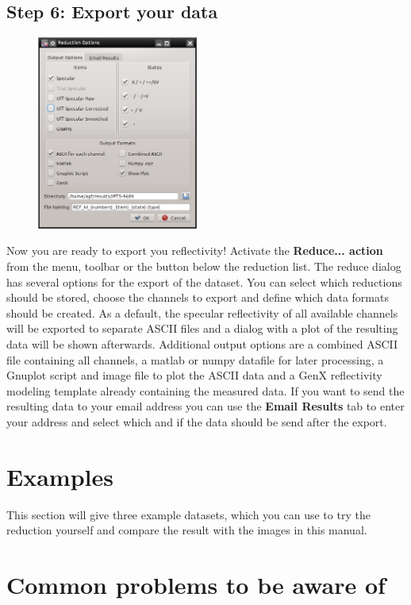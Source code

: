 \subsection{Step 6: Export your data}
  \label{sec:export}
    \begin{figure}
    \centering
     \includegraphics[width=150pt]{screenshots/reduced.png}
    \end{figure}
    Now you are ready to export you reflectivity! 
    Activate the \textbf{Reduce... action}  from the menu, toolbar or the button below the reduction list.
    The reduce dialog has several options for the export of the dataset.
    You can select which reductions should be stored, choose the channels to export and define which data formats should be created.
    As a default, the specular reflectivity of all available channels will be exported to separate ASCII files and a dialog with a plot of the resulting data will be shown afterwards.
    Additional output options are a combined ASCII file containing all channels, a matlab or numpy datafile for later processing, a Gnuplot script and image file to plot the ASCII data and a GenX reflectivity modeling template already containing the measured data.
    If you want to send the resulting data to your email address you can use the \textbf{Email Results} tab to enter your address and select which and if the data should be send after the export.
    
    

\section{Examples}
  This section will give three example datasets, which you can use to try the reduction yourself and compare the result with the images in this manual.
  
\section{Common problems to be aware of}
